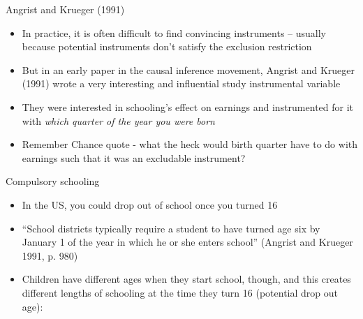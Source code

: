 \documentclass{beamer}
\begin{document}
\begin{frame}{Angrist and Krueger (1991)}
	
	\begin{itemize}
	\item In practice, it is often difficult to find convincing instruments -- usually because potential instruments don't satisfy the exclusion restriction
	\item But in an early paper in the causal inference movement, Angrist and Krueger (1991) wrote a very interesting and influential study instrumental variable 
	\item They were interested in schooling's effect on earnings and instrumented for it with \emph{which quarter of the year you were born}
	\item Remember Chance quote - what the heck would birth quarter have to do with earnings such that it was an excludable instrument?
	\end{itemize}
	
\end{frame}


\begin{frame}{Compulsory schooling}

\begin{itemize}

	\item In the US, you could drop out of school once you turned 16
	\item ``School districts typically require a student to have turned age six by January 1 of the year in which he or she enters school'' (Angrist and Krueger 1991, p. 980)
	\item Children have different ages when they start school, though, and this creates different lengths of schooling at the time they turn 16 (potential drop out age):
	\end{itemize}
	
\end{frame}
\end{document}
